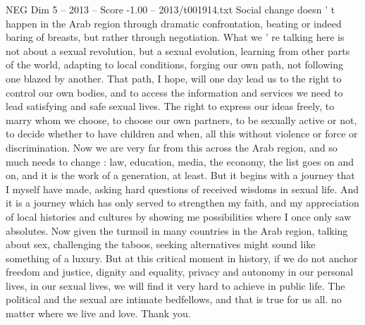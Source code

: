 \begin{textsample}{NEG Dim 5 – 2013 – Score -1.00 – 2013/t001914.txt}
Social change doesn ' t happen in the Arab region through dramatic confrontation, beating or indeed baring of breasts, but rather through negotiation.
What we ' re talking here is not about a sexual revolution, but a sexual evolution, learning from other parts of the world, adapting to local conditions, forging our own path, not following one blazed by another.
That path, I hope, will one day lead us to the right to control our own bodies, and to access the information and services we need to lead satisfying and safe sexual lives.
The right to express our ideas freely, to marry whom we choose, to choose our own partners, to be sexually active or not, to decide whether to have children and when, all this without violence or force or discrimination.
Now we are very far from this across the Arab region, and so much needs to change : law, education, media, the economy, the list goes on and on, and it is the work of a generation, at least.
But it begins with a journey that I myself have made, asking hard questions of received wisdoms in sexual life.
And it is a journey which has only served to strengthen my faith, and my appreciation of local histories and cultures by showing me possibilities where I once only saw absolutes.
Now given the turmoil in many countries in the Arab region, talking about sex, challenging the taboos, seeking alternatives might sound like something of a luxury.
But at this critical moment in history, if we do not anchor freedom and justice, dignity and equality, privacy and autonomy in our personal lives, in our sexual lives, we will find it very hard to achieve in public life.
The political and the sexual are intimate bedfellows, and that is true for us all. no matter where we live and love.
Thank you.

\end{textsample}
